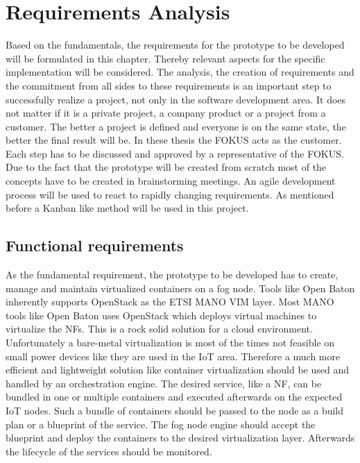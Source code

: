 \chapter{Requirements Analysis}
\label{chapter:requirements-analysis}
\minitoc\vspace{.5cm}
Based on the fundamentals, the requirements for the prototype to be developed will be formulated in this chapter.
Thereby relevant aspects for the specific implementation will be considered.
The analysis, the creation of requirements and the commitment from all sides to these requirements is an important step to successfully realize a project, not only in the software development area.
It does not matter if it is a private project, a company product or a project from a customer.
The better a project is defined and everyone is on the same state, the better the final result will be.
In these thesis the \ac{FOKUS} acts as the customer.
Each step has to be discussed and approved by a representative of the \ac{FOKUS}.
Due to the fact that the prototype will be created from scratch most of the concepts have to be created in brainstorming meetings.
An agile development process will be used to react to rapidly changing requirements.
As mentioned before a Kanban like method will be used in this project.


\section{Functional requirements}
\label{section:functional-requirements}
As the fundamental requirement, the prototype to be developed has to create, manage and maintain virtualized containers on a fog node.
Tools like Open Baton inherently supports OpenStack as the \ac{ETSI} \ac{MANO} \ac{VIM} layer.
Most \ac{MANO} tools like Open Baton uses OpenStack which deploys virtual machines to virtualize the \acp{NF}.
This is a rock solid solution for a cloud environment.
Unfortunately a bare-metal virtualization is most of the times not feasible on small power devices like they are used in the \ac{IoT} area.
Therefore a much more efficient and lightweight solution like container virtualization should be used and handled by an orchestration engine.
The desired service, like a \ac{NF}, can be bundled in one or multiple containers and executed afterwards on the expected \ac{IoT} nodes.
Such a bundle of containers should be passed to the node as a build plan or a blueprint of the service.
The fog node engine should accept the blueprint and deploy the containers to the desired virtualization layer.
Afterwards the lifecycle of the services should be monitored.

